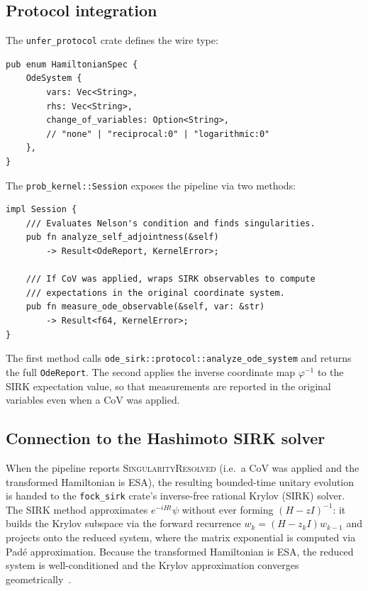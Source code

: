 \documentclass[11pt,a4paper]{article}
\begin{document}
\subsection{Protocol integration}

The \texttt{unfer\_protocol} crate defines the wire type:
\begin{lstlisting}[language={},caption={\texttt{unfer\_protocol::HamiltonianSpec}}]
pub enum HamiltonianSpec {
    OdeSystem {
        vars: Vec<String>,
        rhs: Vec<String>,
        change_of_variables: Option<String>,
        // "none" | "reciprocal:0" | "logarithmic:0"
    },
}
\end{lstlisting}

The \texttt{prob\_kernel::Session} exposes the pipeline via two methods:
\begin{lstlisting}[language={},caption={\texttt{prob\_kernel::Session}}]
impl Session {
    /// Evaluates Nelson's condition and finds singularities.
    pub fn analyze_self_adjointness(&self)
        -> Result<OdeReport, KernelError>;

    /// If CoV was applied, wraps SIRK observables to compute
    /// expectations in the original coordinate system.
    pub fn measure_ode_observable(&self, var: &str)
        -> Result<f64, KernelError>;
}
\end{lstlisting}
The first method calls
\texttt{ode\_sirk::protocol::analyze\_ode\_system} and returns the full
\texttt{OdeReport}.  The second applies the inverse coordinate map
$\varphi^{-1}$ to the SIRK expectation value, so that measurements are
reported in the original variables even when a CoV was applied.

\subsection{Connection to the Hashimoto SIRK solver}

When the pipeline reports \textsc{SingularityResolved} (i.e.\ a CoV was
applied and the transformed Hamiltonian is ESA), the resulting
bounded-time unitary evolution is handed to the \texttt{fock\_sirk}
crate's inverse-free rational Krylov (SIRK) solver.  The SIRK method
approximates $e^{-iHt}\psi$ without ever forming $(H-zI)^{-1}$: it
builds the Krylov subspace via the forward recurrence
$w_{k}=(H-z_{k}I)w_{k-1}$ and projects onto the reduced system, where
the matrix exponential is computed via Pad\'e approximation.  Because
the transformed Hamiltonian is ESA, the reduced system is
well-conditioned and the Krylov approximation converges
geometrically~\cite{hashimoto_shift-invert_2019,hashimoto_shift-invert_2016}.
\end{document}
